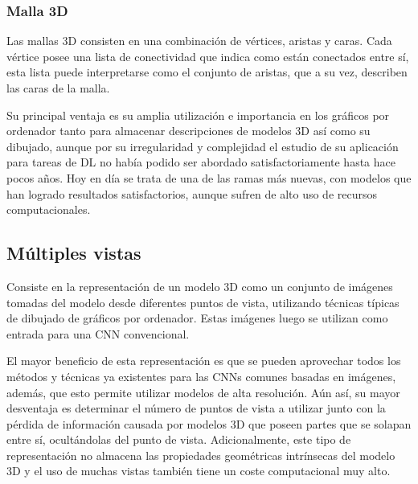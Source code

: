 \subsubsection{Malla 3D}
Las mallas 3D consisten en una combinación de vértices, aristas y caras. Cada vértice posee una lista de conectividad que indica como están conectados entre sí, esta lista puede interpretarse como el conjunto de aristas, que a su vez, describen las caras de la malla.

Su principal ventaja es su amplia utilización e importancia en los gráficos por ordenador tanto para almacenar descripciones de modelos 3D así como su dibujado, aunque por su irregularidad y complejidad el estudio de su aplicación para tareas de DL no había podido ser abordado satisfactoriamente hasta hace pocos años. Hoy en día se trata de una de las ramas más nuevas, con modelos que han logrado resultados satisfactorios, aunque sufren de alto uso de recursos computacionales.

\subsection{Múltiples vistas}
Consiste en la representación de un modelo 3D como un conjunto de imágenes tomadas del modelo desde diferentes puntos de vista, utilizando técnicas típicas de dibujado de gráficos por ordenador. Estas imágenes luego se utilizan como entrada para una CNN convencional.

El mayor beneficio de esta representación es que se pueden aprovechar todos los métodos y técnicas ya existentes para las CNNs comunes basadas en imágenes, además, que esto permite utilizar modelos de alta resolución. Aún así, su mayor desventaja es determinar el número de puntos de vista a utilizar junto con la pérdida de información causada por modelos 3D que poseen partes que se solapan entre sí, ocultándolas del punto de vista. Adicionalmente, este tipo de representación no almacena las propiedades geométricas intrínsecas del modelo 3D y el uso de muchas vistas también tiene un coste computacional muy alto.